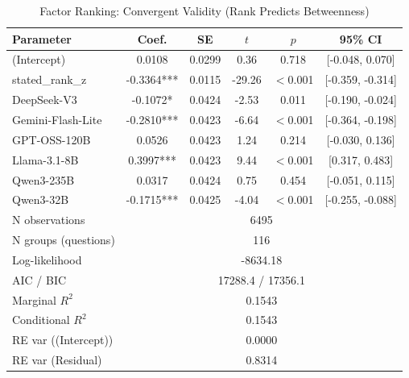 \begin{table}[htbp]
\centering
\small
\caption{Factor Ranking: Convergent Validity (Rank Predicts Betweenness)}
\label{tab:lme_ranking_convergent_table}
\begin{tabular}{lccccc}
\toprule
Parameter & Coef. & SE & $t$ & $p$ & 95\% CI \\
\midrule
  (Intercept) & 0.0108 & 0.0299 & 0.36 & 0.718 & [-0.048, 0.070] \\
  stated\_rank\_z & -0.3364*** & 0.0115 & -29.26 & $<$0.001 & [-0.359, -0.314] \\
  DeepSeek-V3 & -0.1072* & 0.0424 & -2.53 & 0.011 & [-0.190, -0.024] \\
  Gemini-Flash-Lite & -0.2810*** & 0.0423 & -6.64 & $<$0.001 & [-0.364, -0.198] \\
  GPT-OSS-120B & 0.0526 & 0.0423 & 1.24 & 0.214 & [-0.030, 0.136] \\
  Llama-3.1-8B & 0.3997*** & 0.0423 & 9.44 & $<$0.001 & [0.317, 0.483] \\
  Qwen3-235B & 0.0317 & 0.0424 & 0.75 & 0.454 & [-0.051, 0.115] \\
  Qwen3-32B & -0.1715*** & 0.0425 & -4.04 & $<$0.001 & [-0.255, -0.088] \\
\midrule
  N observations & \multicolumn{5}{c}{6495} \\
  N groups (questions) & \multicolumn{5}{c}{116} \\
  Log-likelihood & \multicolumn{5}{c}{-8634.18} \\
  AIC / BIC & \multicolumn{5}{c}{17288.4 / 17356.1} \\
  Marginal $R^2$ & \multicolumn{5}{c}{0.1543} \\
  Conditional $R^2$ & \multicolumn{5}{c}{0.1543} \\
  RE var ((Intercept)) & \multicolumn{5}{c}{0.0000} \\
  RE var (Residual) & \multicolumn{5}{c}{0.8314} \\
\bottomrule
\end{tabular}
\end{table}

